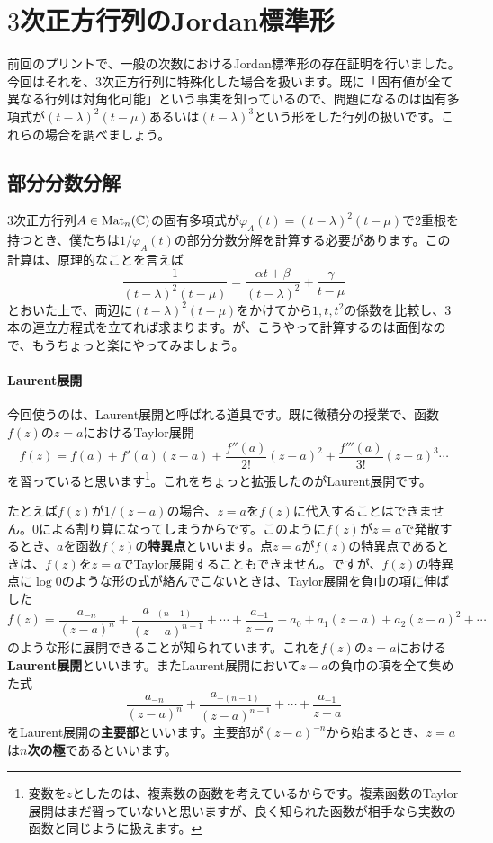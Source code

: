 \section{$3$次正方行列のJordan標準形}

前回のプリントで、一般の次数におけるJordan標準形の存在証明を行いました。今回はそれを、$3$次正方行列に特殊化した場合を扱います。既に「固有値が全て異なる行列は対角化可能」という事実を知っているので、問題になるのは固有多項式が$(t - \lambda)^2 (t - \mu)$あるいは$(t - \lambda)^3$という形をした行列の扱いです。これらの場合を調べましょう。

\subsection{部分分数分解}

$3$次正方行列$A \in \operatorname{Mat}_n(\mathbb{C})$の固有多項式が$\varphi_A(t) = (t - \lambda)^2 (t - \mu)$で$2$重根を持つとき、僕たちは$1/\varphi_A(t)$の部分分数分解を計算する必要があります。この計算は、原理的なことを言えば
\[
\frac{1}{(t - \lambda)^2 (t - \mu)} = \frac{\alpha t + \beta}{(t - \lambda)^2} + \frac{\gamma}{t - \mu}
\]
とおいた上で、両辺に$(t - \lambda)^2 (t - \mu)$をかけてから$1, t, t^2$の係数を比較し、$3$本の連立方程式を立てれば求まります。が、こうやって計算するのは面倒なので、もうちょっと楽にやってみましょう。

\paragraph{Laurent展開}

今回使うのは、Laurent展開と呼ばれる道具です。既に微積分の授業で、函数$f(z)$の$z = a$におけるTaylor展開
\[
f(z) = f(a) + f'(a) (z - a) + \frac{f''(a)}{2!} (z - a)^2 + \frac{f'''(a)}{3!}(z - a)^3 \cdots
\]
を習っていると思います\footnote{変数を$z$としたのは、複素数の函数を考えているからです。複素函数のTaylor展開はまだ習っていないと思いますが、良く知られた函数が相手なら実数の函数と同じように扱えます。}。これをちょっと拡張したのがLaurent展開です。

たとえば$f(z)$が$1/(z - a)$の場合、$z = a$を$f(z)$に代入することはできません。$0$による割り算になってしまうからです。このように$f(z)$が$z = a$で発散するとき、$a$を函数$f(z)$の\textbf{特異点}といいます。点$z = a$が$f(z)$の特異点であるときは、$f(z)$を$z = a$でTaylor展開することもできません。ですが、$f(z)$の特異点に$\log 0$のような形の式が絡んでこないときは、Taylor展開を負巾の項に伸ばした
\[
f(z) = \frac{a_{-n}}{(z - a)^n} + \frac{a_{-(n - 1)}}{(z - a)^{n - 1}} + \cdots + \frac{a_{-1}}{z - a} + a_0 + a_1 (z - a) + a_2 (z - a)^2 + \cdots
\]
のような形に展開できることが知られています。これを$f(z)$の$z = a$における\textbf{Laurent展開}といいます。またLaurent展開において$z - a$の負巾の項を全て集めた式
\[
\frac{a_{-n}}{(z - a)^n} + \frac{a_{- (n - 1)}}{(z - a)^{n - 1}} + \cdots + \frac{a_{-1}}{z - a}
\]
をLaurent展開の\textbf{主要部}といいます。主要部が$(z - a)^{-n}$から始まるとき、$z = a$は\textbf{$n$次の極}であるといいます。

